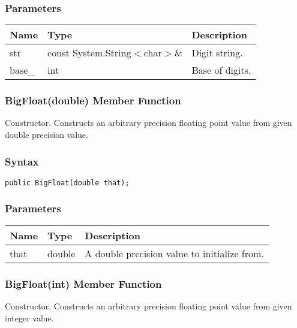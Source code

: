 \documentclass[a4paper,oneside,11.000000pt]{book}
\begin{document}
\subsubsection*{Parameters}
\begin{flushleft}
\begin{supertabular}[l]{lll}
\textbf{Name}
& \textbf{Type}
& \textbf{Description}
\\
\hline
str
& const System.\-String$<$\-char$>$\-\&\-
& Digit string.

\\
base\_
& int
& Base of digits.

\\
\end{supertabular}

\end{flushleft}
\clearpage

\hypertarget{System.Numerics.Multiprecision.BigFloat.constructor.P.System.Numerics.Multiprecision.BigFloat.double}{\subsubsection*{BigFloat(double) Member Function}}
\begin{flushleft}
Constructor. Constructs an arbitrary precision floating point value from given double precision value.

\end{flushleft}
\subsubsection*{Syntax}\texttt{public BigFloat(double that);}

\subsubsection*{Parameters}
\begin{flushleft}
\begin{supertabular}[l]{lll}
\textbf{Name}
& \textbf{Type}
& \textbf{Description}
\\
\hline
that
& double
& A double precision value to initialize from.

\\
\end{supertabular}

\end{flushleft}
\clearpage

\hypertarget{System.Numerics.Multiprecision.BigFloat.constructor.P.System.Numerics.Multiprecision.BigFloat.int}{\subsubsection*{BigFloat(int) Member Function}}
\begin{flushleft}
Constructor. Constructs an arbitrary precision floating point value from given integer value.

\end{flushleft}
\end{document}

